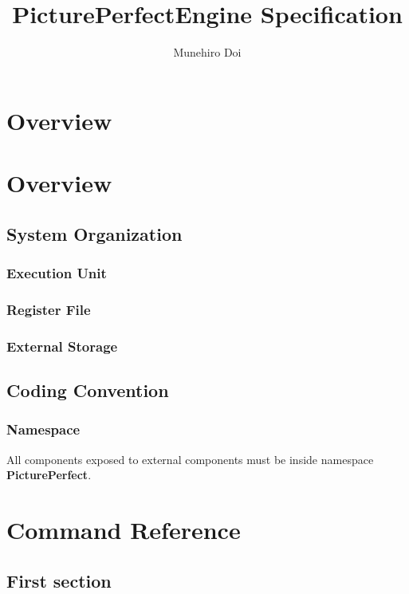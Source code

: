 \documentclass[11pt]{jsbook} %
\title{PicturePerfectEngine Specification}
\author{Munehiro Doi}
\begin{document}
\maketitle


\chapter{Overview}

\chapter{Overview}

\section{System Organization}


\subsection{Execution Unit}

\subsection{Register File}

\subsection{External Storage}

\section{Coding Convention}

\subsection{Namespace}

All components exposed to external components must be inside namespace \textbf{PicturePerfect}.


\chapter{Command Reference}

\section{First section}
\end{document}
